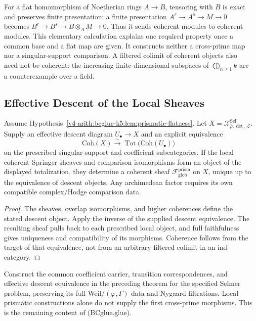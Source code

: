 \begin{remark}
For a flat homomorphism of Noetherian rings \(A\to B\), tensoring
with \(B\) is exact and preserves finite presentation: a finite
presentation \(A^r\to A^s\to M\to0\) becomes
\(B^r\to B^s\to B\otimes_A M\to0\). Thus it sends coherent
modules to coherent modules. This elementary calculation explains
one required property once a common base and a flat map are given.
It constructs neither a cross-prime map nor a singular-support
comparison. A filtered colimit of coherent objects also need not
be coherent: the increasing finite-dimensional subspaces of
\(\bigoplus_{n\ge1}k\) are a counterexample over a field.
\end{remark}

\subsection{Effective Descent of the Local Sheaves}

\begin{theorem}
\label{v4-arith:bcglue-k5:thm:prismatic-gluing}
Assume Hypothesis~\ref{v4-arith:bcglue-k5:lem:prismatic-flatness}.
Let \(X=\mathcal X^{\mathrm{Sel}}_{\bar\rho,\det,\mathcal L}\).
Supply an effective descent diagram \(U_\bullet\to X\) and an
explicit equivalence
\[
 \mathrm{Coh}(X)\xrightarrow{\sim}
 \operatorname{Tot}\bigl(\mathrm{Coh}(U_\bullet)\bigr)
\]
on the prescribed singular-support and coefficient subcategories.
If the local coherent Springer sheaves and comparison isomorphisms
form an object of the displayed totalization, they determine a
coherent sheaf \(\mathcal F_{\mathrm{glob}}^{\mathrm{prism}}\) on \(X\),
unique up to the equivalence of descent objects.
Any archimedean factor requires its own compatible complex/Hodge
comparison data.
\end{theorem}
\begin{proof}
The sheaves, overlap isomorphisms, and higher coherences define the
stated descent object. Apply the inverse of the supplied descent
equivalence. The resulting sheaf pulls back to each prescribed local
object, and full faithfulness gives uniqueness and compatibility of
its morphisms. Coherence follows from the target of that equivalence,
not from an arbitrary filtered colimit in an ind-category.
\end{proof}

\begin{question}
Construct the common coefficient carrier, transition correspondences,
and effective descent equivalence in the preceding theorem for the
specified Selmer problem, preserving its full Weil/\((\varphi,\Gamma)\)
data and Nygaard filtrations. Local prismatic constructions alone
do not supply the first cross-prime morphisms. This is the remaining
content of (BCglue.glue).
\end{question}

